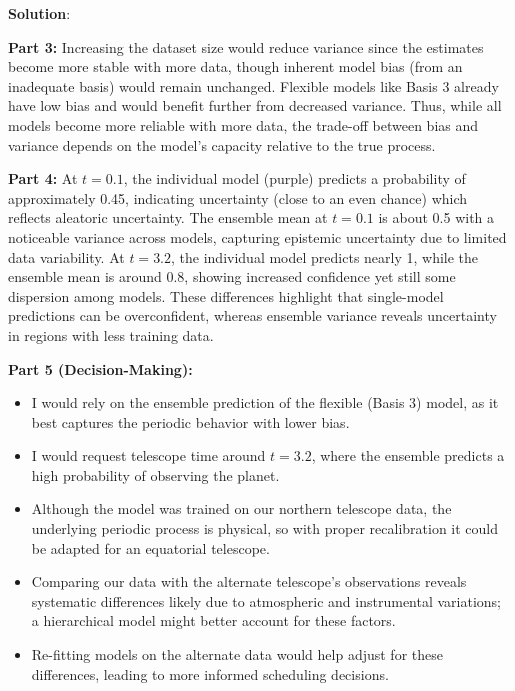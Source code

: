 \documentclass[submit]{../harvardml}
\newenvironment{solution}{
    \vspace{2mm}
    \color{blue}\noindent\textbf{Solution}:
}{}
\begin{document}
\begin{solution}
\begin{tcolorbox}[colback=white,breakable]
\vspace{2mm}
\textbf{Part 3:}  
Increasing the dataset size would reduce variance since the estimates become more stable with more data, though inherent model bias (from an inadequate basis) would remain unchanged. Flexible models like Basis 3 already have low bias and would benefit further from decreased variance. Thus, while all models become more reliable with more data, the trade-off between bias and variance depends on the model’s capacity relative to the true process.

\vspace{2mm}
\textbf{Part 4:}  
At $t = 0.1$, the individual model (purple) predicts a probability of approximately 0.45, indicating uncertainty (close to an even chance) which reflects aleatoric uncertainty. The ensemble mean at $t = 0.1$ is about 0.5 with a noticeable variance across models, capturing epistemic uncertainty due to limited data variability. At $t = 3.2$, the individual model predicts nearly 1, while the ensemble mean is around 0.8, showing increased confidence yet still some dispersion among models. These differences highlight that single-model predictions can be overconfident, whereas ensemble variance reveals uncertainty in regions with less training data.

\vspace{2mm}
\textbf{Part 5 (Decision-Making):}
\begin{itemize}
    \item I would rely on the ensemble prediction of the flexible (Basis 3) model, as it best captures the periodic behavior with lower bias.
    \item I would request telescope time around $t=3.2$, where the ensemble predicts a high probability of observing the planet.
    \item Although the model was trained on our northern telescope data, the underlying periodic process is physical, so with proper recalibration it could be adapted for an equatorial telescope.
    \item Comparing our data with the alternate telescope’s observations reveals systematic differences likely due to atmospheric and instrumental variations; a hierarchical model might better account for these factors.
    \item Re-fitting models on the alternate data would help adjust for these differences, leading to more informed scheduling decisions.
\end{itemize}

\end{tcolorbox}
\end{solution}
\end{document}
